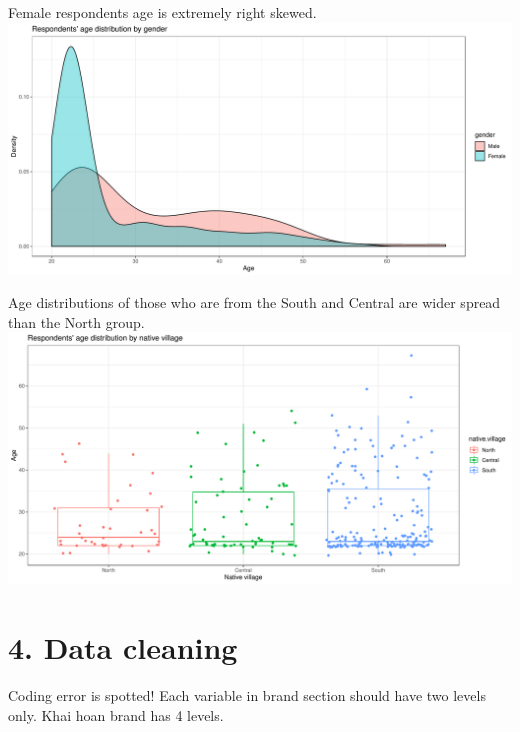 \documentclass[]{article}
\begin{document}
Female respondents age is extremely right skewed.
\includegraphics{Consumer-attitude-towards-fish-sauce-products_files/figure-latex/unnamed-chunk-8-1.pdf}

Age distributions of those who are from the South and Central are wider
spread than the North group.
\includegraphics{Consumer-attitude-towards-fish-sauce-products_files/figure-latex/unnamed-chunk-9-1.pdf}

\hypertarget{data-cleaning}{%
\section{4. Data cleaning}\label{data-cleaning}}

Coding error is spotted! Each variable in brand section should have two
levels only. Khai hoan brand has 4 levels.
\end{document}

